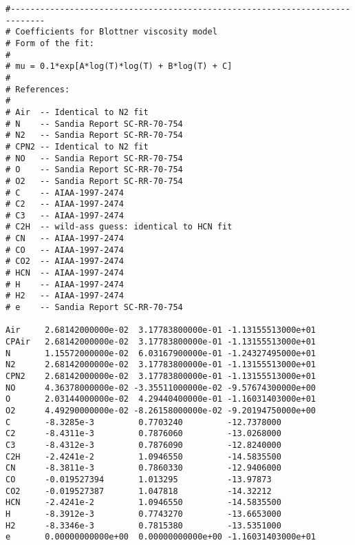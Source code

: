 \linenumbers*
\begin{verbatim}
#-----------------------------------------------------------------------------
# Coefficients for Blottner viscosity model
# Form of the fit:
# 
# mu = 0.1*exp[A*log(T)*log(T) + B*log(T) + C]
# 
# References:
# 
# Air  -- Identical to N2 fit
# N    -- Sandia Report SC-RR-70-754
# N2   -- Sandia Report SC-RR-70-754
# CPN2 -- Identical to N2 fit
# NO   -- Sandia Report SC-RR-70-754
# O    -- Sandia Report SC-RR-70-754
# O2   -- Sandia Report SC-RR-70-754
# C    -- AIAA-1997-2474
# C2   -- AIAA-1997-2474
# C3   -- AIAA-1997-2474
# C2H  -- wild-ass guess: identical to HCN fit
# CN   -- AIAA-1997-2474
# CO   -- AIAA-1997-2474
# CO2  -- AIAA-1997-2474
# HCN  -- AIAA-1997-2474
# H    -- AIAA-1997-2474
# H2   -- AIAA-1997-2474
# e    -- Sandia Report SC-RR-70-754

Air     2.68142000000e-02  3.17783800000e-01 -1.13155513000e+01
CPAir   2.68142000000e-02  3.17783800000e-01 -1.13155513000e+01
N       1.15572000000e-02  6.03167900000e-01 -1.24327495000e+01
N2      2.68142000000e-02  3.17783800000e-01 -1.13155513000e+01
CPN2    2.68142000000e-02  3.17783800000e-01 -1.13155513000e+01
NO      4.36378000000e-02 -3.35511000000e-02 -9.57674300000e+00
O       2.03144000000e-02  4.29440400000e-01 -1.16031403000e+01
O2      4.49290000000e-02 -8.26158000000e-02 -9.20194750000e+00
C       -8.3285e-3         0.7703240         -12.7378000
C2      -8.4311e-3         0.7876060         -13.0268000
C3      -8.4312e-3         0.7876090         -12.8240000
C2H     -2.4241e-2         1.0946550         -14.5835500
CN      -8.3811e-3         0.7860330         -12.9406000
CO      -0.019527394       1.013295          -13.97873
CO2     -0.019527387       1.047818          -14.32212
HCN     -2.4241e-2         1.0946550         -14.5835500
H       -8.3912e-3         0.7743270         -13.6653000
H2      -8.3346e-3         0.7815380         -13.5351000
e       0.00000000000e+00  0.00000000000e+00 -1.16031403000e+01
\end{verbatim}
\nolinenumbers
